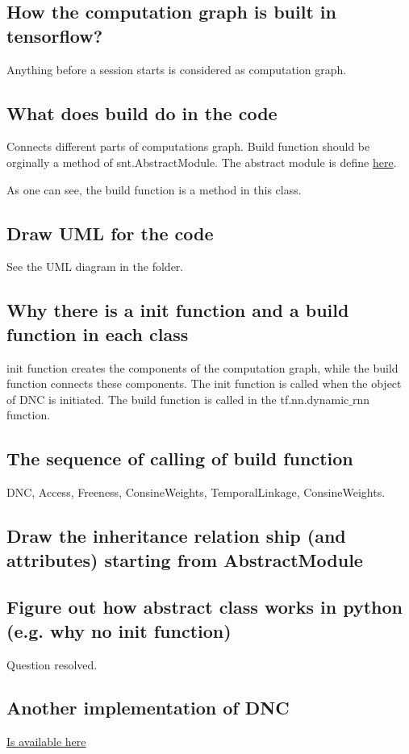 \documentclass{article}
\begin{document}
\subsection{How the computation graph is built in tensorflow?}
Anything before a session starts is considered as computation graph.
\subsection{What does build do in the code}
Connects different parts of computations graph. Build function should be orginally a method of snt.AbstractModule. The abstract module is define 
\href{https://github.com/deepmind/sonnet/blob/master/sonnet/python/modules/base.py}{here}.

As one can see, the build function is a method in this class.
\subsection{Draw UML for the code}
See the UML diagram in the folder.
\subsection{Why there is a init function and a build function in each class}
init function creates the components of the computation graph, while the build function connects these components. The init function is called when the object of DNC is initiated. The build function is called in the tf.nn.dynamic$\_$rnn function.
\subsection{The sequence of calling of build function}
DNC, Access, Freeness, ConsineWeights, TemporalLinkage, ConsineWeights.
\subsection{Draw the inheritance relation ship (and attributes) starting from AbstractModule}
\subsection{Figure out how abstract class works in python (e.g. why no init function)}
Question resolved.

\subsection{Another implementation of DNC}
\href{https://github.com/Mostafa-Samir/DNC-tensorflow/blob/master/dnc/dnc.py}{Is available here}
\end{document}
